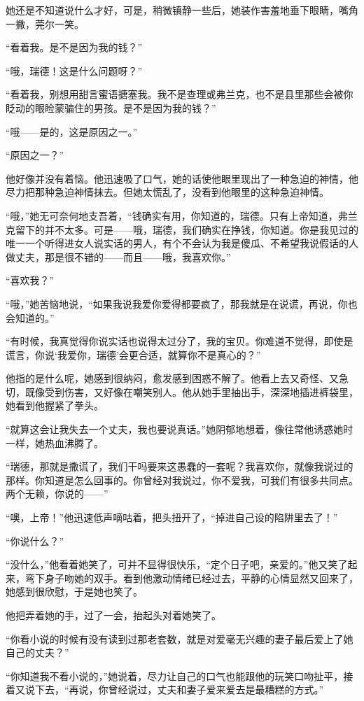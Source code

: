 \par 她还是不知道说什么才好，可是，稍微镇静一些后，她装作害羞地垂下眼睛，嘴角一撇，莞尔一笑。
\par “看着我。是不是因为我的钱？”
\par “哦，瑞德！这是什么问题呀？”
\par “看着我，别想用甜言蜜语搪塞我。我不是查理或弗兰克，也不是县里那些会被你眨动的眼睑蒙骗住的男孩。是不是因为我的钱？”
\par “哦——是的，这是原因之一。”
\par “原因之一？”
\par 他好像并没有着恼。他迅速吸了口气，她的话使他眼里现出了一种急迫的神情，他尽力把那种急迫神情抹去。但她太慌乱了，没看到他眼里的这种急迫神情。
\par “哦，”她无可奈何地支吾着，“钱确实有用，你知道的，瑞德。只有上帝知道，弗兰克留下的并不太多。可是——哦，瑞德，我们确实在挣钱，你知道。你是我见过的唯一一个听得进女人说实话的男人，有个不会认为我是傻瓜、不希望我说假话的人做丈夫，那是很不错的——而且——哦，我喜欢你。”
\par “喜欢我？”
\par “哦，”她苦恼地说，“如果我说我爱你爱得都要疯了，那我就是在说谎，再说，你也会知道的。”
\par “有时候，我真觉得你说实话也说得太过分了，我的宝贝。你难道不觉得，即使是谎言，你说‘我爱你，瑞德’会更合适，就算你不是真心的？”
\par 他指的是什么呢，她感到很纳闷，愈发感到困惑不解了。他看上去又奇怪、又急切，既像受到伤害，又好像在嘲笑别人。他从她手里抽出手，深深地插进裤袋里，她看到他握紧了拳头。
\par “就算这会让我失去一个丈夫，我也要说真话。”她阴郁地想着，像往常他诱惑她时一样，她热血沸腾了。
\par “瑞德，那就是撒谎了，我们干吗要来这愚蠢的一套呢？我喜欢你，就像我说过的那样。你知道是怎么回事的。你曾经对我说过，你不爱我，可我们有很多共同点。两个无赖，你说的——”
\par “噢，上帝！”他迅速低声嘀咕着，把头扭开了，“掉进自己设的陷阱里去了！”
\par “你说什么？”
\par “没什么，”他看着她笑了，可并不显得很快乐，“定个日子吧，亲爱的。”他又笑了起来，弯下身子吻她的双手。看到他激动情绪已经过去，平静的心情显然又回来了，她感到很欣慰，于是她也笑了。
\par 他把弄着她的手，过了一会，抬起头对着她笑了。
\par “你看小说的时候有没有读到过那老套数，就是对爱毫无兴趣的妻子最后爱上了她自己的丈夫？”
\par “你知道我不看小说的，”她说着，尽力让自己的口气也能跟他的玩笑口吻扯平，接着又说下去，“再说，你曾经说过，丈夫和妻子爱来爱去是最糟糕的方式。”

